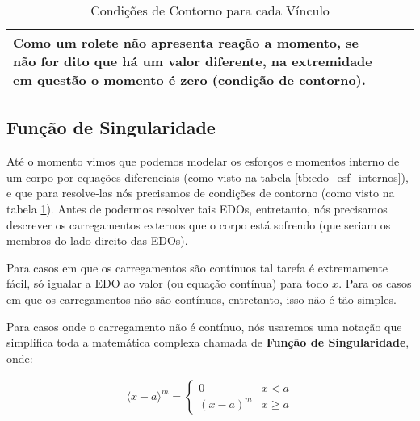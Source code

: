 \documentclass{article}
\begin{document}
\begin{table}[h]
\begin{tabular}{|l|c|l|}
                            \begin{minipage}{.4\textwidth}
                                \vspace{5px}
                                Como um rolete não apresenta reação a momento, \textbf{se não for dito que há um valor diferente}, na extremidade em questão o momento é zero (condição de contorno).
                            \end{minipage} \\ \hline    
                    \end{tabular}
                    \caption{Condições de Contorno para cada Vínculo}
                    \label{tb:cond_contorno}
                \end{table}

            \newpage
            \subsection{Função de Singularidade}
                Até o momento vimos que podemos modelar os esforços e momentos interno de um corpo por equações diferenciais (como visto na tabela \ref{tb:edo_esf_internos}), e que para resolve-las
                nós precisamos de condições de contorno (como visto na tabela \ref{tb:cond_contorno}). Antes de podermos resolver tais EDOs, entretanto, nós precisamos descrever os carregamentos
                externos que o corpo está sofrendo (que seriam os membros do lado direito das EDOs).

                Para casos em que os carregamentos são contínuos tal tarefa é extremamente fácil, só igualar a EDO ao valor (ou equação contínua) para todo $x$. Para os casos em que os carregamentos não são contínuos, entretanto, isso não é tão simples.

                Para casos onde o carregamento não é contínuo, nós usaremos uma notação que simplifica toda a matemática complexa chamada de \textbf{Função de Singularidade}, onde:

                \begin{align}
                    \langle x - a\rangle^m = \begin{cases}
                        0          & x<a \\ 
                        (x-a)^m    & x \ge a
                    \end{cases}
                    \label{eq:func_singularidade}
                \end{align}
\end{document}
